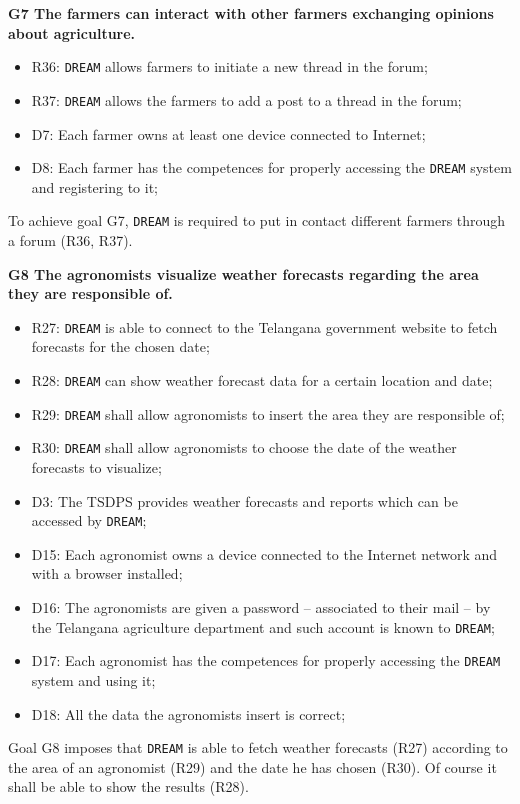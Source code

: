 \documentclass{article}
\begin{document}
\vspace{5mm}
\textbf{G7 The farmers can interact with other farmers exchanging opinions about agriculture.}
\begin{itemize}
    \item R36: \verb|DREAM| allows farmers to initiate a new thread in the forum;
  
    \item R37: \verb|DREAM| allows the farmers to add a post to a thread in the forum;
    
    \item D7: Each farmer owns at least one device connected to Internet;
    
    \item D8: Each farmer has the competences for properly accessing the \verb|DREAM| system and registering to it;
  
\end{itemize}
To achieve goal G7, \verb|DREAM| is required to put in contact different farmers through a forum (R36, R37).

\vspace{5mm}
\textbf{G8 The agronomists visualize weather forecasts regarding the area they are responsible of.}
\begin{itemize}
    \item R27: \verb|DREAM| is able to connect to the Telangana government website to fetch forecasts for the chosen date;

    \item R28: \verb|DREAM| can show weather forecast data for a certain location and date;

    \item R29: \verb|DREAM| shall allow agronomists to insert the area they are responsible of;

    \item R30: \verb|DREAM| shall allow agronomists to choose the date of the weather forecasts to visualize;
    
    \item D3: The TSDPS provides weather forecasts and reports which can be accessed by \verb|DREAM|;
    
    \item D15: Each agronomist owns a device connected to the Internet network and with a browser installed;

    \item D16: The agronomists are given a password – associated to their mail – by the Telangana agriculture department and such account is known to \verb|DREAM|;

    \item D17: Each agronomist has the competences for properly accessing the \verb|DREAM| system and using it;
  
    \item D18: All the data the agronomists insert is correct;

\end{itemize}
Goal G8 imposes that \verb|DREAM| is able to fetch weather forecasts (R27) according to the area of an agronomist (R29) and the date he has chosen (R30). Of course it shall be able to show the results (R28).
\end{document}
